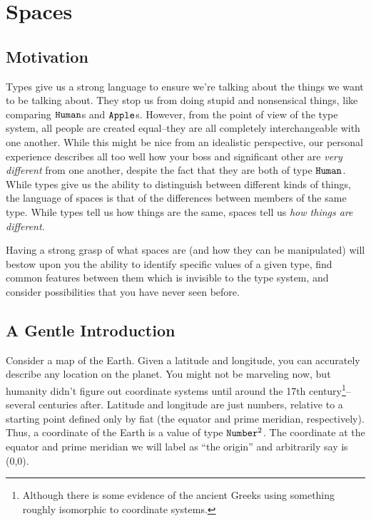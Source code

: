 \documentclass[12pt]{book}
\newcommand{\subtitle}[1]{}
\newcommand{\type}[1]{\ensuremath{\text{\texttt{#1}}}}
\newcommand{\coord}[1]{(#1)}
\begin{document}
\chapter{Spaces}
\subtitle{The Language of Possibilities}
\subtitle{The Language of Low Structure}
\section{Motivation}
Types give us a strong language to ensure we're talking about the things we want to be talking about. They stop us from
doing stupid and nonsensical things, like comparing \type{Human}s and \type{Apple}s. However, from the point of view
of the type system, all people are created equal--they are all completely interchangeable with one another. While this
might be nice from an idealistic perspective, our personal experience describes all too well how your boss and
significant other are \textit{very different} from one another, despite the fact that they are both of type
\type{Human}. While types give us the ability to distinguish between different kinds of things, the language of spaces
is that of the differences between members of the same type. While types tell us how things are the same, spaces tell us
\textit{how things are different}.

Having a strong grasp of what spaces are (and how they can be manipulated) will bestow upon you the ability to
identify specific values of a given type, find common features between them which is invisible to the type system, and
consider possibilities that you have never seen before.


\section{A Gentle Introduction}
Consider a map of the Earth. Given a latitude and longitude, you can accurately describe any location on the planet. You
might not be marveling now, but humanity didn't figure out coordinate systems until around the 17th
century\footnote{Although there is some evidence of the ancient Greeks using something roughly isomorphic to coordinate
systems.}--several centuries after. Latitude and longitude are
just numbers, relative to a starting point defined only by fiat (the equator and prime meridian, respectively). Thus, a
coordinate of the Earth is a value of type $\type{Number}^2$. The coordinate at the equator and prime meridian we will
label as ``the origin'' and arbitrarily say is \coord{0,0}.
\end{document}
